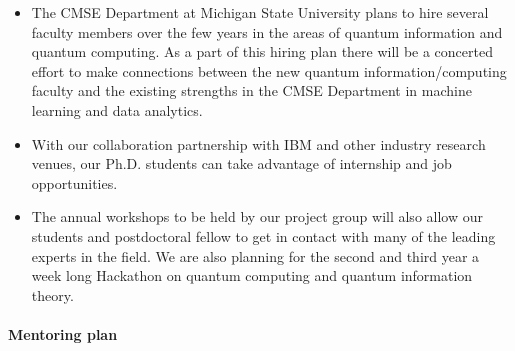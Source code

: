 \documentclass[11pt]{article}
\begin{document}
\begin{itemize}
    \item The CMSE Department at Michigan State University plans to hire several faculty members over the few years in the areas of quantum information and quantum computing.  As a part of this hiring plan there will be a concerted effort to make connections between the new quantum information/computing faculty and the existing strengths in the CMSE Department in machine learning and data analytics.
    \item With our collaboration partnership with IBM and other industry research venues, our Ph.D. students can take advantage of internship and job opportunities. 
    \item The annual workshops to be held by our project group will also allow our students and postdoctoral fellow to get in contact with many of the leading experts in the field. We are also planning for the second and third year a week long Hackathon on quantum computing and quantum information theory.
\end{itemize}

\paragraph{Mentoring plan}
\end{document}
